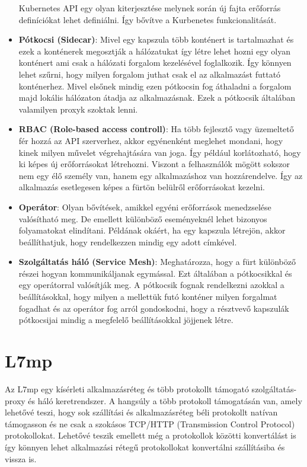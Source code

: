 \begin{itemize}
	Kubernetes API egy olyan kiterjesztése melynek során új fajta erőforrás definíciókat
	lehet definiálni. Így bővítve a Kurbenetes funkcionalitását.
	\item \textbf{Pótkocsi (Sidecar)}: Mivel egy kapszula több konténert is tartalmazhat
	és ezek a konténerek megosztják a hálózatukat így létre lehet hozni egy olyan konténert
	ami csak a hálózati forgalom kezelésével foglalkozik. Így könnyen lehet szűrni, hogy
	milyen forgalom juthat csak el az alkalmazást futtató konténerhez. Mivel elsőnek 
	mindig ezen pótkocsin fog áthaladni a forgalom majd lokális hálózaton átadja az
	alkalmazásnak. Ezek a pótkocsik általában valamilyen proxyk szoktak lenni. 
	\item \textbf{RBAC (Role-based access controll)}: Ha több fejlesztő vagy üzemeltető
	fér hozzá az API szerverhez, akkor egyénenként meglehet mondani, hogy kinek milyen 
	művelet végrehajtására van joga. Így például korlátozható, hogy ki képes új
	erőforrásokat létrehozni. Viszont a felhasználók mögött sokszor nem egy élő 
	személy van, hanem egy alkalmazáshoz van hozzárendelve. Így az alkalmazás esetlegesen
	képes a fürtön belülről erőforrásokat kezelni.
	\item \textbf{Operátor}: Olyan bővítések, amikkel egyéni erőforrások menedzselése
	valósítható meg. De emellett különböző eseményeknél lehet bizonyos folyamatokat 
	elindítani. Példának okáért, ha egy kapszula létrejön, akkor beállíthatjuk, hogy
	rendelkezzen mindig egy adott címkével.
	\item \textbf{Szolgáltatás háló (Service Mesh)}: Meghatározza, hogy a fürt 
	különböző részei hogyan kommunikáljanak egymással. Ezt általában a pótkocsikkal és 
	egy operátorral valósítják meg. A pótkocsik fognak rendelkezni azokkal a beállításokkal,
	hogy milyen a mellettük futó konténer milyen forgalmat fogadhat és az operátor 
	fog arról gondoskodni, hogy a résztvevő kapszulák pótkocsijai mindig a megfelelő
	beállításokkal jöjjenek létre.
\end{itemize}

\section{L7mp}

Az L7mp egy kísérleti alkalmazásréteg és több protokollt támogató szolgáltatás- 
proxy és háló keretrendszer. A hangsúly a több protokoll támogatásán van, amely
lehetővé teszi, hogy sok szállítási és alkalmazásréteg béli protokollt 
natívan támogasson és ne csak a szokásos TCP/HTTP (Transmission Control Protocol) 
protokollokat. Lehetővé teszik emellett még a protokollok közötti konvertálást is 
így könnyen lehet alkalmazási rétegű protokollokat konvertálni szállításiba és vissza is.

